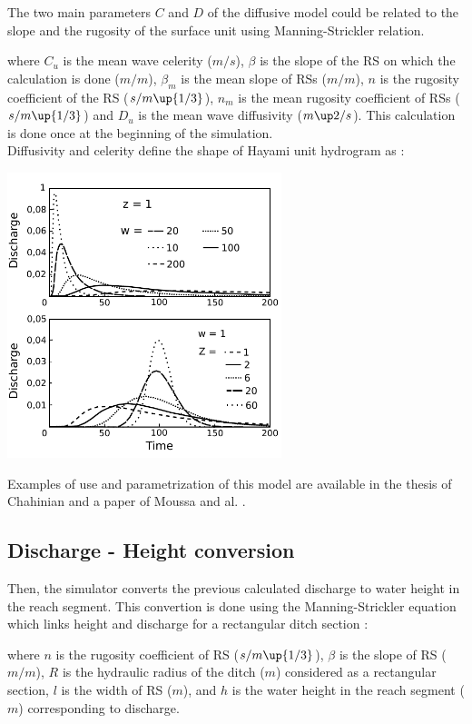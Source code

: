 The two main parameters $C$ and $D$ of the diffusive model could be related to the slope and the rugosity of the surface unit using Manning-Strickler relation.



where $C_u$ is the mean wave celerity ($m/s$), $\beta$ is the slope of the RS on which the calculation is done ($m/m$), $\beta_m$ is the mean slope of RSs ($m/m$), $n$ is the rugosity coefficient of the RS ($s/m\up{1/3}$), $n_m$ is the mean rugosity coefficient of RSs ($s/m\up{1/3}$) and $D_u$ is the mean wave diffusivity ($m\up2/s$). This calculation is done once at the beginning of the simulation.\\

Diffusivity and celerity define the shape of Hayami unit hydrogram as :


\includegraphics[width=8cm]{common/Graphique_noyau_Hayami.pdf}

Examples of use and parametrization of this model are available in the thesis of Chahinian \cite{Chahinian2004} and a paper of Moussa and al. \cite{Moussa2002}.


\subsection{Discharge - Height conversion}
Then, the simulator converts the previous calculated discharge to water height in the reach segment. This convertion is done using the Manning-Strickler equation which links height and discharge for a rectangular ditch section :



where $n$ is the rugosity coefficient of RS ($s/m\up{1/3}$), $\beta$ is the slope of RS ($m/m$), $R$ is the hydraulic radius of the ditch ($m$) considered as a rectangular section, $l$ is the width of RS ($m$), and $h$ is the water height in the reach segment ($m$) corresponding to discharge.\\

